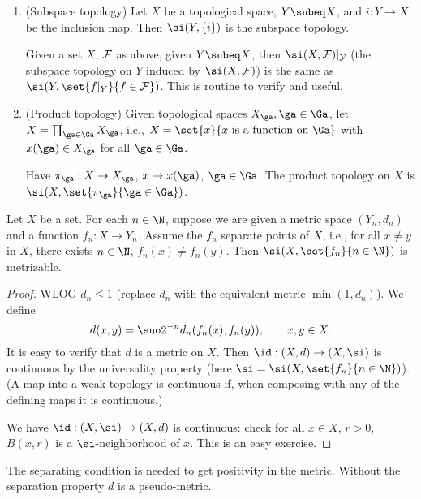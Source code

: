\begin{ex}
\begin{enumerate}
\item (Subspace topology)
Let $X$ be a topological space, $Y\subeq X$, and $i:Y\to X$ be the inclusion map. Then $\si(Y,\{i\})$ is the subspace topology.

Given a set $X$, $\cal F$ as above, given $Y\subeq X$, then $\si(X,\cal F)|_Y$ (the subspace topology on $Y$ induced by $\si(X,\cal F)$) is the same as $\si(Y, \set{f|_Y}{f\in \cal F})$. This is routine to verify and useful.
\item
(Product topology) Given topological spaces $X_{\ga},\ga\in \Ga$, let $X=\prod_{\ga\in \Ga}X_{\ga}$, i.e., $X=\set{x}{x\text{ is a function on }\Ga}$ with $x(\ga)\in X_{\ga}$ for all $\ga\in \Ga$.

Have $\pi_{\ga}:X\to X_{\ga}$, $x\mapsto x(\ga)$, $\ga\in \Ga$. The product topology on $X$ is $\si(X,\set{\pi_{\ga}}{\ga\in \Ga})$. 
\end{enumerate}
\end{ex}
%

\begin{pr}
Let $X$ be a set. For each $n\in \N$, suppose we are given a metric space $(Y_n,d_n)$ and a function $f_n:X\to Y_n$. Assume the $f_n$ separate points of $X$, i.e., for all $x\ne y$ in $X$, there exists $n\in \N$, $f_n(x)\ne f_n(y)$. Then $\si(X,\set{f_n}{n\in \N})$ is metrizable. 
\end{pr}
\begin{proof}
WLOG $d_n\le 1$ (replace $d_n$ with the equivalent metric $\min(1,d_n)$). We define
\[
d(x,y)=\suo 2^{-n} d_n(f_n(x),f_n(y)),\qquad x,y\in X.
\]
It is easy to verify that $d$ is a metric on $X$. Then $\id:(X,d)\to (X,\si)$ is continuous by the universality property (here $\si=\si(X,\set{f_n}{n\in \N})$). (A map into a weak topology is continuous if, when composing with any of the defining maps it is continuous.)

We have $\id:(X,\si)\to (X,d)$ is continuous: check for all $x\in X$, $r>0$, $B(x,r)$ is a $\si$-neighborhood of $x$. This is an easy exercise.
\end{proof}
The separating condition is needed to get positivity in the metric. Without the separation property $d$ is a pseudo-metric.

